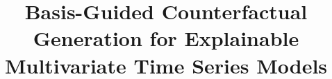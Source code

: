 \documentclass[runningheads]{llncs}
\begin{document}
	
	\title{Basis-Guided Counterfactual Generation for Explainable Multivariate Time Series Models}
	
	
	
	
%	
%	
	
	
	\maketitle              %
	
\end{document}
